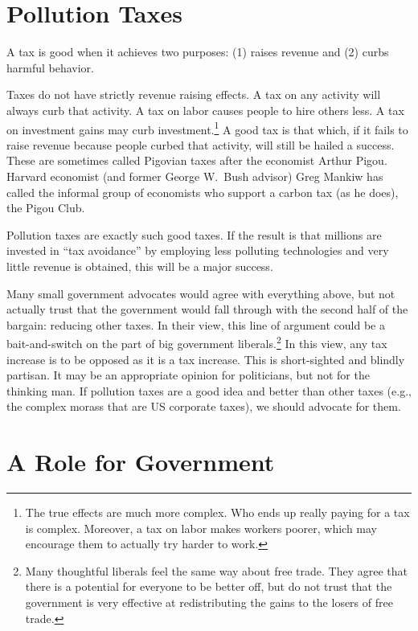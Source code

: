 
\section{Pollution Taxes}

A tax is good when it achieves two purposes: (1) raises revenue and (2) curbs
harmful behavior.

Taxes do not have strictly revenue raising effects. A tax on any activity will
always curb that activity. A tax on labor causes people to hire others
less. A tax on investment gains may curb investment.\footnote{The true effects
are much more complex. Who ends up really paying for a tax is complex.
Moreover, a tax on labor makes workers poorer, which may encourage them to
actually try harder to work.} A good tax is that which, if it fails to raise
revenue because people curbed that activity, will still be hailed a success.
These are sometimes called Pigovian taxes after the economist Arthur Pigou.
Harvard economist (and former George W.\ Bush advisor) Greg Mankiw has called
the informal group of economists who support a carbon tax (as he does), the
Pigou Club.

Pollution taxes are exactly such good taxes. If the result is that millions are
invested in ``tax avoidance'' by employing less polluting technologies and very
little revenue is obtained, this will be a major success.

Many small government advocates would agree with everything above, but not
actually trust that the government would fall through with the second half of
the bargain: reducing other taxes. In their view, this line of argument could
be a bait-and-switch on the part of big government liberals.\footnote{Many
thoughtful liberals feel the same way about free trade. They agree that there
is a potential for everyone to be better off, but do not trust that the
government is very effective at redistributing the gains to the losers of free
trade.} In this view, any tax increase is to be opposed as it is a tax
increase. This is short-sighted and blindly partisan. It may be an appropriate
opinion for politicians, but not for the thinking man. If pollution taxes are a
good idea and better than other taxes (e.g., the complex morass that are US
corporate taxes), we should advocate for them.

\section{A Role for Government}


